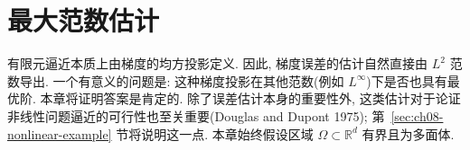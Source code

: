 \section{最大范数估计}
\label{chap:ch08-max-norm-estimates}

有限元逼近本质上由梯度的均方投影定义. 因此, 梯度误差的估计自然直接由 $L^2$ 范数导出. 一个有意义的问题是: 这种梯度投影在其他范数(例如 $L^\infty$)下是否也具有最优阶. 本章将证明答案是肯定的. 除了误差估计本身的重要性外, 这类估计对于论证非线性问题逼近的可行性也至关重要(Douglas and Dupont 1975); 第~\ref{sec:ch08-nonlinear-example} 节将说明这一点. 本章始终假设区域 $\Omega\subset\mathbb R^d$ 有界且为多面体.










